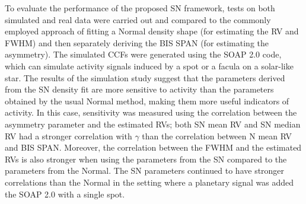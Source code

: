 \documentclass{aa}
\begin{document}
To evaluate the performance of the proposed SN framework, tests on both simulated and real data were carried out and compared to the commonly employed approach of fitting a Normal density shape (for estimating the RV and FWHM) and then separately deriving the BIS SPAN (for estimating the asymmetry).
The simulated CCFs were generated using the SOAP 2.0 code, which can simulate activity signals induced by a spot or a facula on a solar-like star. The results of the simulation study suggest that the parameters derived from the SN density fit are more sensitive to activity than the parameters obtained by the usual Normal method, making them more useful indicators of activity.
In this case, sensitivity was measured using the correlation between the asymmetry parameter and the estimated RVs; both SN mean RV and SN median RV had a stronger correlation with $\gamma$ than the correlation between N mean RV and BIS SPAN. 
Moreover, the correlation between the FWHM and the estimated RVs is also stronger when using the parameters from the SN compared to the parameters from the Normal. 
The SN parameters continued to have stronger correlations than the Normal in the setting where a planetary signal was added the SOAP 2.0 with a single spot.
\end{document}
